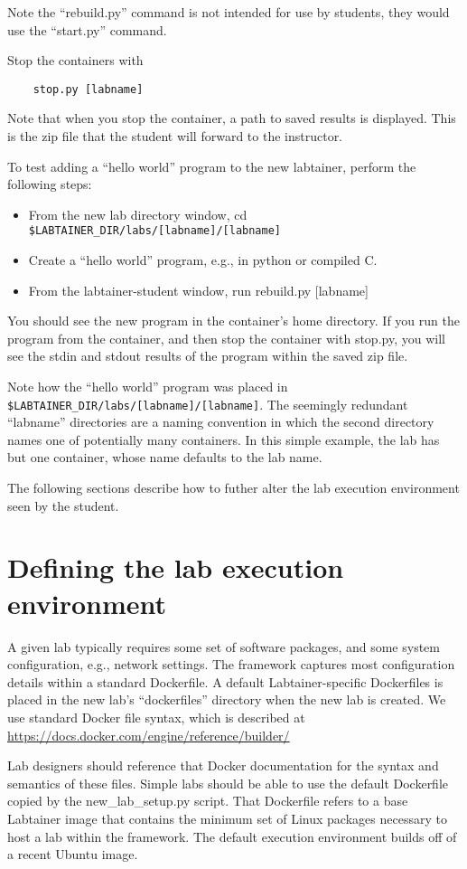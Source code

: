 \documentclass[12pt]{article}
\begin{document}
Note the ``rebuild.py'' command is not intended for use by students, they would use the ``start.py'' command.  

Stop the containers with 
\begin{verbatim}
    stop.py [labname]
\end{verbatim}
Note that when you stop the container, a path to saved results is displayed.
This is the zip file that the student will forward to the instructor.

To test adding a ``hello world'' program to the new labtainer, perform the following steps:
\begin{itemize}
\item From the new lab directory window, cd \verb!$LABTAINER_DIR/labs/[labname]/[labname]!
\item Create a ``hello world'' program, e.g., in python or compiled C.
\item From the labtainer-student window, run rebuild.py [labname]
\end{itemize}
    
You should see the new program in the container's
home directory.  If you run the program from the container, and then stop the container
with stop.py, you will see the stdin and stdout results of the program within the
saved zip file.

Note how the ``hello world'' program was placed in \verb!$LABTAINER_DIR/labs/[labname]/[labname]!.
The seemingly redundant ``labname'' directories are a naming convention in which the
second directory names one of potentially many containers.  In this simple example,
the lab has but one container, whose name defaults to the lab name.

The following sections describe how to futher alter the lab execution environment seen by 
the student.

\section {Defining the lab execution environment}
A given lab typically requires some set of software packages, and some
system configuration, e.g., network settings.  
The framework captures most configuration details within a standard
Dockerfile.  A default Labtainer-specific Dockerfiles is placed in the new lab's ``dockerfiles'' 
directory when the new lab is created.  We use standard Docker file syntax, which is described at 
\url{https://docs.docker.com/engine/reference/builder/}

Lab designers should reference that Docker documentation for the 
syntax and semantics of these files.
Simple labs should be able to use the default Dockerfile copied by the 
new\_lab\_setup.py script.  That Dockerfile refers to a base Labtainer
image that contains the minimum set of Linux packages necessary to 
host a lab within the framework.  The default
execution environment builds off of a recent Ubuntu image.
\end{document}
